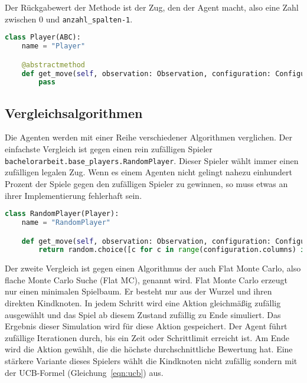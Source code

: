 Der Rückgabewert der Methode ist der Zug, den der Agent macht, also eine Zahl zwischen 0 und \verb|anzahl_spalten-1|.

\begin{lstlisting}[language=Python,caption=Die Basisklasse aller Agenten.,label={lst:baseplayer}]
class Player(ABC):
    name = "Player"

    @abstractmethod
    def get_move(self, observation: Observation, configuration: Configuration) -> int:
        pass
\end{lstlisting}

\subsection{Vergleichsalgorithmen}
\label{chap:vergleiche-impl}

Die Agenten werden mit einer Reihe verschiedener Algorithmen verglichen.
Der einfachste Vergleich ist gegen einen rein zufälligen Spieler \verb|bachelorarbeit.base_players.RandomPlayer|.
Dieser Spieler wählt immer einen zufälligen legalen Zug.
Wenn es einem Agenten nicht gelingt nahezu einhundert Prozent der Spiele gegen den zufälligen Spieler zu gewinnen, so muss etwas an ihrer Implementierung fehlerhaft sein.

\begin{lstlisting}[language=Python,caption=Ein Spieler der zufällige Züge wählt.,label={lst:randomplayer}]
class RandomPlayer(Player):
    name = "RandomPlayer"

    def get_move(self, observation: Observation, configuration: Configuration) -> int:
        return random.choice([c for c in range(configuration.columns) if observation.board[c] == 0])
\end{lstlisting}

Der zweite Vergleich ist gegen einen Algorithmus der auch Flat Monte Carlo, also flache Monte Carlo Suche (Flat MC), genannt wird.
Flat Monte Carlo erzeugt nur einen minimalen Spielbaum.
Er besteht nur aus der Wurzel und ihren direkten Kindknoten.
In jedem Schritt wird eine Aktion gleichmäßig zufällig ausgewählt und das Spiel ab diesem Zustand zufällig zu Ende simuliert.
Das Ergebnis dieser Simulation wird für diese Aktion gespeichert.
Der Agent führt zufällige Iterationen durch, bis ein Zeit oder Schrittlimit erreicht ist.
Am Ende wird die Aktion gewählt, die die höchste durchschnittliche Bewertung hat.
Eine stärkere Variante dieses Spielers wählt die Kindknoten nicht zufällig sondern mit der UCB-Formel (Gleichung~\ref{eqn:ucb}) aus.

